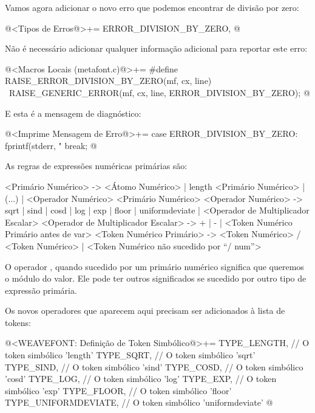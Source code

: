 Vamos agora adicionar o novo erro que podemos encontrar de divisão por
zero:

\iniciocodigo
@<Tipos de Erros@>+=
ERROR_DIVISION_BY_ZERO,
@
\fimcodigo

Não é necessário adicionar qualquer informação adicional para reportar
este erro:

\iniciocodigo
@<Macros Locais (metafont.c)@>+=
#define RAISE_ERROR_DIVISION_BY_ZERO(mf, cx, line) {\
    RAISE_GENERIC_ERROR(mf, cx, line, ERROR_DIVISION_BY_ZERO);}
@
\fimcodigo

E esta é a mensagem de diagnóstico:

\iniciocodigo
@<Imprime Mensagem de Erro@>+=
case ERROR_DIVISION_BY_ZERO:
  fprintf(stderr, "%
  break;
@
\fimcodigo



As regras de expressões numéricas primárias são:

\alinhaverbatim
<Primário Numérico> -> <Átomo Numérico> |
                       length <Primário Numérico> | (...) |
                       <Operador Numérico> <Primário Numérico>
<Operador Numérico> -> sqrt | sind | cosd | log | exp | floor |
                       uniformdeviate |
                       <Operador de Multiplicador Escalar>
<Operador de Multiplicador  Escalar> -> + | - |
                       <Token Numérico Primário antes de var>
<Token Numérico Primário> -> <Token Numérico> / <Token Numérico> |
                             <Token Numérico não sucedido por ``/ num''>
\alinhanormal

O operador , quando sucedido por um primário
numérico significa que queremos o módulo do valor. Ele pode ter outros
significados se sucedido por outro tipo de expressão primária.

Os novos operadores que aparecem aqui precisam ser adicionados à lista
de tokens:

\iniciocodigo
@<WEAVEFONT: Definição de Token Simbólico@>+=
TYPE_LENGTH,         // O token simbólico 'length'
TYPE_SQRT,           // O token simbólico 'sqrt'
TYPE_SIND,           // O token simbólico 'sind'
TYPE_COSD,           // O token simbólico 'cosd'
TYPE_LOG,            // O token simbólico 'log'
TYPE_EXP,            // O token simbólico 'exp'
TYPE_FLOOR,          // O token simbólico 'floor'
TYPE_UNIFORMDEVIATE, // O token simbólico 'uniformdeviate'
@
\fimcodigo

